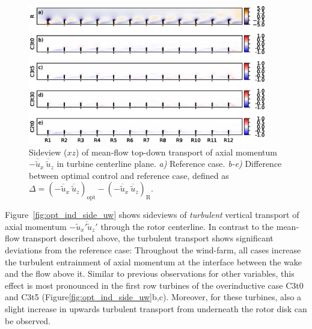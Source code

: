 	\begin{figure}[t]
		\centering
		\includegraphics[width=0.93\textwidth]{chapters/optimal_induction_control/sideview_uwm.eps}
		\caption{Sideview ($xz$) of mean-flow top-down transport of axial momentum $- \overline{\widetilde{u}}_x~ \overline{\widetilde{u}}_z$ in turbine centerline plane. \emph{a) } Reference case. \emph{b-e)} Difference between optimal control and reference case, defined as $\Delta = (- \overline{\widetilde{u}}_x~ \overline{\widetilde{u}}_z)_{\text{opt}} - (- \overline{\widetilde{u}}_x~ \overline{\widetilde{u}}_z)_{\text{R}}$. \label{fig:opt_ind_side_uwm}}
	\end{figure}

	Figure~\ref{fig:opt_ind_side_uw} shows sideviews of \emph{turbulent} vertical transport of axial momentum $- \overline{\widetilde{u}_x'\widetilde{u}_z'}$ through the rotor centerline. In contrast to the mean-flow transport described above, the turbulent transport shows significant deviations from the reference case: Throughout the wind-farm, all cases increase the turbulent entrainment of axial momentum at the interface between the wake and the flow above it. Similar to previous observations for other variables, this effect is most pronounced in the first row turbines of the overinductive case C3t0 and C3t5 (Figure\ref{fig:opt_ind_side_uw}b,c). Moreover, for these turbines, also a slight increase in upwards turbulent transport from underneath the rotor disk can be observed.

